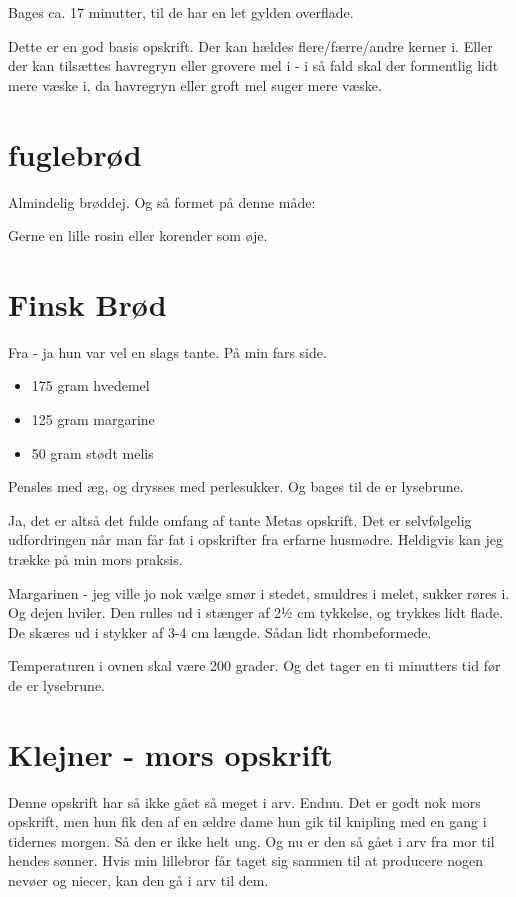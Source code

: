 \documentclass[
]{book}
\makeatletter
\newcommand*\pandocbounded[1]{%
  \sbox\pandoc@box{#1}%
  \Gscale@div\@tempa{\textheight}{\dimexpr\ht\pandoc@box+\dp\pandoc@box\relax}%
  \Gscale@div\@tempb{\linewidth}{\wd\pandoc@box}%
  \ifdim\@tempb\p@<\@tempa\p@\let\@tempa\@tempb\fi%
  \ifdim\@tempa\p@<\p@\scalebox{\@tempa}{\usebox\pandoc@box}%
  \else\usebox{\pandoc@box}%
  \fi%
}
\providecommand{\tightlist}{%
  \setlength{\itemsep}{0pt}\setlength{\parskip}{0pt}}
\makeatother
\begin{document}
Bages ca. 17 minutter, til de har en let gylden overflade.

Dette er en god basis opskrift. Der kan hældes flere/færre/andre
kerner i. Eller der kan tilsættes havregryn eller grovere
mel i - i så fald skal der formentlig lidt mere væske i, da
havregryn eller groft mel suger mere væske.

\section{fuglebrød}\label{fuglebruxf8d}

Almindelig brøddej. Og så formet på denne måde:
\pandocbounded{\texttt{[image: images/fuglebrød.jpg]}}
Gerne en lille rosin eller korender som øje.

\section{Finsk Brød}\label{finsk-bruxf8d}

Fra - ja hun var vel en slags tante. På min fars side.

\begin{itemize}
\tightlist
\item
  175 gram hvedemel
\item
  125 gram margarine
\item
  50 gram stødt melis
\end{itemize}

Pensles med æg, og drysses med perlesukker. Og bages til de er lysebrune.

Ja, det er altså det fulde omfang af tante Metas opskrift. Det er selvfølgelig udfordringen når man får fat i opskrifter fra erfarne husmødre. Heldigvis kan jeg trække på min mors praksis.

Margarinen - jeg ville jo nok vælge smør i stedet, smuldres i melet, sukker røres i. Og dejen hviler. Den rulles ud i stænger af 2½ cm tykkelse, og trykkes lidt flade. De skæres ud i stykker af 3-4 cm længde. Sådan lidt rhombeformede.

Temperaturen i ovnen skal være 200 grader. Og det tager en ti minutters tid før de er lysebrune.

\section{Klejner - mors opskrift}\label{klejner---mors-opskrift}

Denne opskrift har så ikke gået så meget i arv. Endnu. Det er godt nok mors opskrift, men hun fik den af en ældre dame hun gik til knipling med en gang i tidernes morgen. Så den er ikke helt ung. Og nu er den så gået i arv fra mor til hendes sønner. Hvis min lillebror får taget sig sammen til at producere nogen nevøer og niecer, kan den gå i arv til dem.
\end{document}
